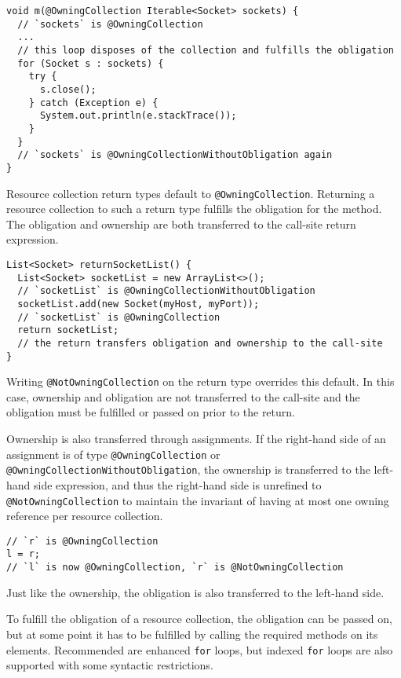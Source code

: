 \begin{Verbatim}
void m(@OwningCollection Iterable<Socket> sockets) {
  // `sockets` is @OwningCollection
  ...
  // this loop disposes of the collection and fulfills the obligation
  for (Socket s : sockets) {
    try {
      s.close();
    } catch (Exception e) {
      System.out.println(e.stackTrace());
    }
  }
  // `sockets` is @OwningCollectionWithoutObligation again
}
\end{Verbatim}

Resource collection return types default to \texttt{@OwningCollection}. Returning a resource collection to such a return type fulfills the obligation for the method. The obligation and ownership are both transferred to the call-site return expression.

\begin{verbatim}
List<Socket> returnSocketList() {
  List<Socket> socketList = new ArrayList<>();
  // `socketList` is @OwningCollectionWithoutObligation
  socketList.add(new Socket(myHost, myPort));
  // `socketList` is @OwningCollection
  return socketList;
  // the return transfers obligation and ownership to the call-site
}
\end{verbatim}

Writing \texttt{@NotOwningCollection} on the return type overrides this default. In this case, ownership and obligation are not transferred to the call-site and the obligation must be fulfilled or passed on prior to the return.

Ownership is also transferred through assignments. If the right-hand side of an assignment is of type \texttt{@OwningCollection} or \texttt{@OwningCollectionWithoutObligation}, the ownership is transferred to the left-hand side expression, and thus the right-hand side is unrefined to \texttt{@NotOwningCollection} to maintain the invariant of having at most one owning reference per resource collection.

\begin{verbatim}
// `r` is @OwningCollection
l = r;
// `l` is now @OwningCollection, `r` is @NotOwningCollection
\end{verbatim}

Just like the ownership, the obligation is also transferred to the left-hand side.


To fulfill the obligation of a resource collection, the obligation can be passed on, but at some point it has to be fulfilled by calling the required methods on its elements. Recommended are enhanced \texttt{for} loops, but indexed \texttt{for} loops are also supported with some syntactic restrictions.

